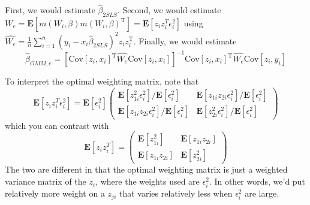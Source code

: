 \documentclass[12pt,english]{article}
\newcommand{\T}{\ensuremath{\text{T}}}
\begin{document}
\begin{enumerate}
	First, we would estimate $\hat{\beta}_{2SLS}$. Second, we would estimate $W_{e} = \mathbf{E}[m(W_{i}, \beta) m(W_{i}, \beta)^{\T}] = \mathbf{E}[z_{i} z_{i}^{T} \epsilon_{i}^{2}]$ using $\hat{W_{e}} = \frac{1}{n} \sum_{i=1}^{n} (y_{i} - x_{i} \hat{\beta}_{2SLS})^{2} z_{i} z_{i}^{\T}$. Finally, we would estimate
	$$\hat{\beta}_{GMM,e} = [\text{Cov}[z_{i}, x_{i}]^{\T} \hat{W_{e}} \text{Cov}[z_{i}, x_{i}]]^{-1} \text{Cov}[z_{i}, x_{i}]^{\T} \hat{W_{e}} \text{Cov}[z_{i}, y_{i}] $$
	
	To interpret the optimal weighting matrix, note that
	$$\mathbf{E}[z_{i} z_{i}^{T} \epsilon_{i}^{2}] = \mathbf{E}[\epsilon_{i}^{2}] \left( \begin{array}{cc} \mathbf{E}[z_{1i}^{2} \epsilon_{i}^{2}] / \mathbf{E}[\epsilon_{i}^{2}] & \mathbf{E}[z_{1i} z_{2i} \epsilon_{i}^{2}] / \mathbf{E}[\epsilon_{i}^{2}] \\ \mathbf{E}[z_{1i} z_{2i} \epsilon_{i}^{2}] / \mathbf{E}[\epsilon_{i}^{2}] & \mathbf{E}[z_{2i}^{2} \epsilon_{i}^{2}] / \mathbf{E}[\epsilon_{i}^{2}] \end{array} \right) $$
	which you can contrast with
	$$\mathbf{E}[z_{i} z_{i}^{T}] = \left( \begin{array}{cc} \mathbf{E}[z_{1i}^{2}] & \mathbf{E}[z_{1i} z_{2i}] \\ \mathbf{E}[z_{1i} z_{2i}] & \mathbf{E}[z_{2i}^{2}] \end{array} \right) $$
	The two are different in that the optimal weighting matrix is just a weighted variance matrix of the $z_{i}$, where the weights used are $\epsilon_{i}^{2}$. In other words, we'd put relatively more weight on a $z_{ji}$ that varies relatively less when $\epsilon_{i}^{2}$ are large.
\end{enumerate}
\end{document}
